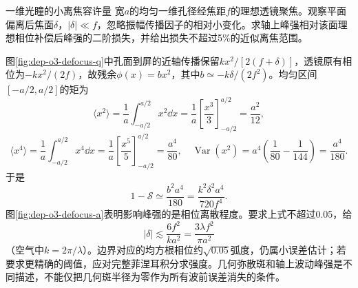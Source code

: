 \begin{example}一维光瞳的小离焦容许量
宽$a$的均匀一维孔径经焦距$f$的理想透镜聚焦。观察平面偏离后焦面$\delta$，$|\delta|\ll f$，忽略振幅传播因子的相对小变化。求轴上峰强相对该面理想相位补偿后峰强的二阶损失，并给出损失不超过5\%的近似离焦范围。
\end{example}
\begin{solution}
图\ref{fig:dep-o3-defocus-q}中孔面到屏的近轴传播保留$kx^2/[2(f+\delta)]$，透镜原有相位为$-kx^2/(2f)$，故残余$\phi(x)=bx^2$，其中$b\simeq-k\delta/(2f^2)$。均匀区间$[-a/2,a/2]$的矩为
\[
 \langle x^2\rangle=\frac1a\int_{-a/2}^{a/2}x^2\dd x
 =\frac1a\left[\frac{x^3}{3}\right]_{-a/2}^{a/2}=\frac{a^2}{12},
\]
\[
 \langle x^4\rangle=\frac1a\int_{-a/2}^{a/2}x^4\dd x
 =\frac1a\left[\frac{x^5}{5}\right]_{-a/2}^{a/2}=\frac{a^4}{80},
 \quad \operatorname{Var}(x^2)=a^4\left(\frac1{80}-\frac1{144}\right)=\frac{a^4}{180}.
\]
于是
\[
 1-\mathcal S\simeq\frac{b^2a^4}{180}
 =\frac{k^2\delta^2a^4}{720f^4}.
\]
图\ref{fig:dep-o3-defocus-a}表明影响峰强的是相位离散程度。要求上式不超过0.05，给
\[
 |\delta|\lesssim\frac{6f^2}{ka^2}=
 \frac{3\lambda f^2}{\pi a^2}
\]
（空气中$k=2\pi/\lambda$）。边界对应的均方根相位约$\sqrt{0.05}$弧度，仍属小误差估计；若要求更精确的阈值，应对完整菲涅耳积分求强度。几何弥散斑和轴上波动峰强是不同描述，不能仅把几何斑半径为零作为所有波前误差消失的条件。
\end{solution}

